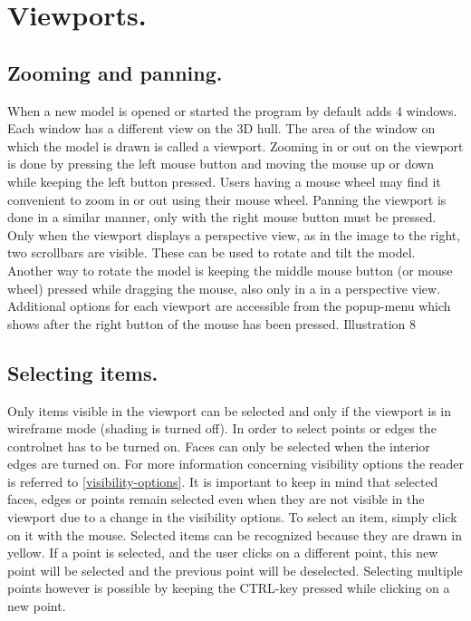 \documentclass[12pt]{article}
\begin{document}
\section{Viewports.}

\subsection{Zooming and panning.}
When a new model is opened or started the program by default adds 4
windows. Each window has a different view on the 3D hull. The area of
the window on which the model is drawn is called a viewport. Zooming
in or out on the viewport is done by pressing the left mouse button
and moving the mouse up or down while keeping the left button pressed.
Users having a mouse wheel may find it convenient to zoom in or out
using their mouse wheel. Panning the viewport is done in a similar
manner, only with the right mouse button must be pressed. Only when
the viewport displays a perspective view, as in the image to the
right, two scrollbars are visible. These can be used to rotate and
tilt the model. Another way to rotate the model is keeping the middle
mouse button (or mouse wheel) pressed while dragging the mouse, also
only in a in a perspective view. Additional options for each viewport
are accessible from the popup-menu which shows after the right button
of the mouse has been pressed.
Illustration 8

\subsection{Selecting items.}
Only items visible in the viewport can be selected and only if the
viewport is in wireframe mode (shading is turned off). In order to
select points or edges the controlnet has to be turned on. Faces can
only be selected when the interior edges are turned on. For more
information concerning visibility options the reader is referred
to \ref{visibility-options}. It is important to keep in mind that
selected faces, edges or points remain selected even when they are not
visible in the viewport due to a change in the visibility options. To
select an item, simply click on it with the mouse. Selected items can
be recognized because they are drawn in yellow. If a point is
selected, and the user clicks on a different point, this new point
will be selected and the previous point will be deselected.  Selecting
multiple points however is possible by keeping the CTRL-key pressed
while clicking on a new point.
\end{document}

